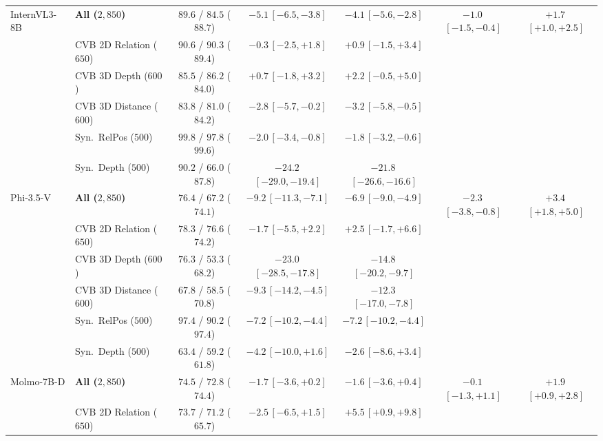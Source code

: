 \begin{tabular}{@{}llccccc@{}}
\midrule
InternVL3-8B & \textbf{All ($2{,}850$)} & $89.6$ / $84.5$ ($88.7$) & $-5.1$\,{\scriptsize$[-6.5, -3.8]$} & $-4.1$\,{\scriptsize$[-5.6, -2.8]$} & $-1.0$\,{\scriptsize$[-1.5, -0.4]$} & $+1.7$\,{\scriptsize$[+1.0, +2.5]$} \\
 & CVB 2D Relation ($650$) & $90.6$ / $90.3$ ($89.4$) & $-0.3$\,{\scriptsize$[-2.5, +1.8]$} & $+0.9$\,{\scriptsize$[-1.5, +3.4]$} & & \\
 & CVB 3D Depth ($600$) & $85.5$ / $86.2$ ($84.0$) & $+0.7$\,{\scriptsize$[-1.8, +3.2]$} & $+2.2$\,{\scriptsize$[-0.5, +5.0]$} & & \\
 & CVB 3D Distance ($600$) & $83.8$ / $81.0$ ($84.2$) & $-2.8$\,{\scriptsize$[-5.7, -0.2]$} & $-3.2$\,{\scriptsize$[-5.8, -0.5]$} & & \\
 & Syn.\ RelPos ($500$) & $99.8$ / $97.8$ ($99.6$) & $-2.0$\,{\scriptsize$[-3.4, -0.8]$} & $-1.8$\,{\scriptsize$[-3.2, -0.6]$} & & \\
 & Syn.\ Depth ($500$) & $90.2$ / $66.0$ ($87.8$) & $-24.2$\,{\scriptsize$[-29.0, -19.4]$} & $-21.8$\,{\scriptsize$[-26.6, -16.6]$} & & \\
\midrule
Phi-3.5-V & \textbf{All ($2{,}850$)} & $76.4$ / $67.2$ ($74.1$) & $-9.2$\,{\scriptsize$[-11.3, -7.1]$} & $-6.9$\,{\scriptsize$[-9.0, -4.9]$} & $-2.3$\,{\scriptsize$[-3.8, -0.8]$} & $+3.4$\,{\scriptsize$[+1.8, +5.0]$} \\
 & CVB 2D Relation ($650$) & $78.3$ / $76.6$ ($74.2$) & $-1.7$\,{\scriptsize$[-5.5, +2.2]$} & $+2.5$\,{\scriptsize$[-1.7, +6.6]$} & & \\
 & CVB 3D Depth ($600$) & $76.3$ / $53.3$ ($68.2$) & $-23.0$\,{\scriptsize$[-28.5, -17.8]$} & $-14.8$\,{\scriptsize$[-20.2, -9.7]$} & & \\
 & CVB 3D Distance ($600$) & $67.8$ / $58.5$ ($70.8$) & $-9.3$\,{\scriptsize$[-14.2, -4.5]$} & $-12.3$\,{\scriptsize$[-17.0, -7.8]$} & & \\
 & Syn.\ RelPos ($500$) & $97.4$ / $90.2$ ($97.4$) & $-7.2$\,{\scriptsize$[-10.2, -4.4]$} & $-7.2$\,{\scriptsize$[-10.2, -4.4]$} & & \\
 & Syn.\ Depth ($500$) & $63.4$ / $59.2$ ($61.8$) & $-4.2$\,{\scriptsize$[-10.0, +1.6]$} & $-2.6$\,{\scriptsize$[-8.6, +3.4]$} & & \\
\midrule
Molmo-7B-D & \textbf{All ($2{,}850$)} & $74.5$ / $72.8$ ($74.4$) & $-1.7$\,{\scriptsize$[-3.6, +0.2]$} & $-1.6$\,{\scriptsize$[-3.6, +0.4]$} & $-0.1$\,{\scriptsize$[-1.3, +1.1]$} & $+1.9$\,{\scriptsize$[+0.9, +2.8]$} \\
 & CVB 2D Relation ($650$) & $73.7$ / $71.2$ ($65.7$) & $-2.5$\,{\scriptsize$[-6.5, +1.5]$} & $+5.5$\,{\scriptsize$[+0.9, +9.8]$} & & \\

\end{tabular}
